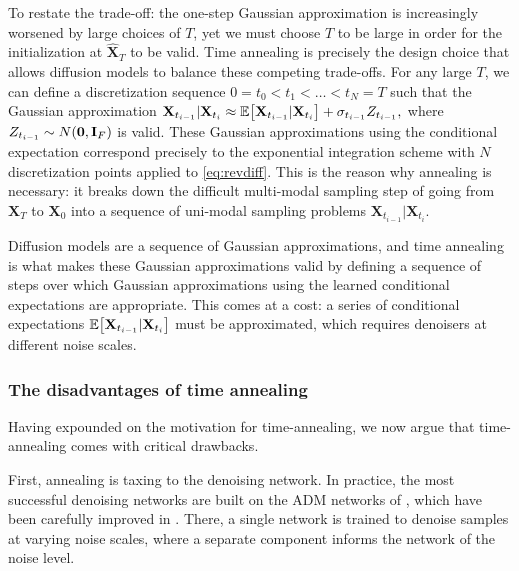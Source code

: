 To restate the trade-off: the one-step Gaussian approximation is increasingly worsened by large choices of $T$, yet we must choose $T$ to be large in order for the initialization at $\hat{\mathbf{X}}_T$ to be valid. Time annealing is precisely the design choice that allows diffusion models to balance these competing trade-offs. For any large $T$, we can define a discretization sequence $0 = t_0 < t_1 < \dots < t_N = T$ such that the Gaussian approximation $
\mathbf{X}_{t_{i-1}}|\mathbf{X}_{t_{i}} \approx \mathbb{E}\mathopen{}\left[\mathbf{X}_{t_{i-1}}|\mathbf{X}_{t_{i}}\right] + \sigma_{t_{i-1}} Z_{t_{i-1}},$
where $Z_{t_{i-1}} \sim N\mathopen{}\left(\mathbf{0}, \mathbf{I}_F\right)$ is valid. These Gaussian approximations using the conditional expectation correspond precisely to the exponential integration scheme with $N$ discretization points applied to \ref{eq:revdiff}. This is the reason why annealing is necessary: it breaks down the difficult multi-modal sampling step of going from $\mathbf{X}_T$ to $\mathbf{X}_0$ into a sequence of uni-modal sampling problems $\mathbf{X}_{t_{i-1}}|\mathbf{X}_{t_i}$. 

Diffusion models are a sequence of Gaussian approximations, and time annealing is what makes these Gaussian approximations valid by defining a sequence of steps over which Gaussian approximations using the learned conditional expectations are appropriate. This comes at a cost: a series of conditional expectations $\mathbb{E}\mathopen{}\left[\mathbf{X}_{t_{i-1}}|\mathbf{X}_{t_{i}}\right]$ must be approximated, which requires denoisers at different noise scales.

\subsubsection{The disadvantages of time annealing}

Having expounded on the motivation for time-annealing, we now argue that time-annealing comes with critical drawbacks.

First, annealing is taxing to the denoising network. In practice, the most successful denoising networks are built on the ADM networks of \cite{dhariwal_diffusion_2021}, which have been carefully improved in \cite{karras_analyzing_2024}. There, a single network is trained to denoise samples at varying noise scales, where a separate component informs the network of the noise level.

